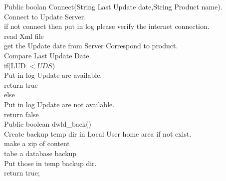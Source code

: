 \documentclass{article}
\begin{document}
                                Public boolan Connect(String Last Update date,String Product name).\\
                               {
                                Connect to Update Server.\\

                                if not connect then put in log please verify the internet connection.\\
                                read Xml file\\
                                get the Update date from Server Correspond to product.\\
                                          Compare Last Update Date.\\
                                          if(LUD $< UDS$)\\
                                          Put in log Update are available.\\
                                          return true\\
                                          else          \\
                                          Put in log Update are not available.\\
                                          return false\\
                                         }
                                          Public boolean dwld\_back()\\
                                         {
                                         Create backup temp dir in Local User home area if not exist.\\
                                         make a zip of content \\
                                         tabe a database backup\\
                                         Put those in temp backup dir.\\
                                         return true;\\
                    }
\end{document}
